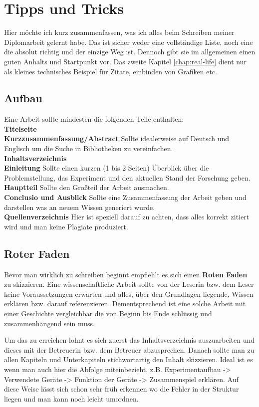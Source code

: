 \chapter{Tipps und Tricks}
Hier möchte ich kurz zusammenfassen, was ich alles beim Schreiben meiner Diplomarbeit gelernt habe. Das ist sicher weder eine vollständige Liste, noch eine die absolut richtig und der einzige Weg ist. Dennoch gibt sie im allgemeinen einen guten Anhalts und Startpunkt vor. Das zweite Kapitel \ref{chap:real-life} dient nur als kleines technisches Beispiel für Zitate, einbinden von Grafiken etc.

\section{Aufbau}
Eine Arbeit sollte mindesten die folgenden Teile enthalten:\\
\textbf{Titelseite}\\
\textbf{Kurzzusammenfassung/Abstract} Sollte idealerweise auf Deutsch und Englisch um die Suche in Bibliotheken zu vereinfachen.\\
\textbf{Inhaltsverzeichnis}\\
\textbf{Einleitung} Sollte einen kurzen (1 bis 2 Seiten) Überblick über die Problemstellung, das Experiment und den aktuellen Stand der Forschung geben.\\
\textbf{Hauptteil} Sollte den Großteil der Arbeit ausmachen.\\
\textbf{Conclusio und Ausblick} Sollte eine Zusammenfassung der Arbeit geben und darstellen was an neuem Wissen generiert wurde.\\
\textbf{Quellenverzeichnis} Hier ist speziell darauf zu achten, dass alles korrekt zitiert wird und man keine Plagiate produziert.

\section{Roter Faden}
Bevor man wirklich zu schreiben beginnt empfiehlt es sich einen \textbf{Roten Faden} zu skizzieren. Eine wissenschaftliche Arbeit sollte von der Leserin bzw. dem Leser keine Voraussetzungen erwarten und alles, über den Grundlagen liegende, Wissen erklären bzw. darauf referenzieren. Dementsprechend ist eine solche Arbeit mit einer Geschichte vergleichbar die von Beginn bis Ende schlüssig und zusammenhängend sein muss.

Um das zu erreichen lohnt es sich zuerst das Inhaltsverzeichnis auszuarbeiten und dieses mit der Betreuerin bzw. dem Betreuer abzusprechen. Danach sollte man zu allen Kapiteln und Unterkapiteln stichwortartig den Inhalt skizzieren. Ideal ist es wenn man auch hier die Abfolge miteinbezieht, z.B. Experimentaufbau -> Verwendete Geräte -> Funktion der Geräte -> Zusammenspiel erklären. Auf diese Weise lässt sich schon sehr früh erkennen wo die Fehler in der Struktur liegen und man kann noch leicht umordnen.

